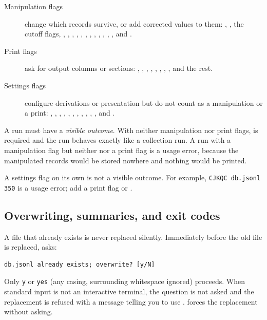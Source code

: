 \begin{description}
  \item[Manipulation flags] change which records survive, or add corrected
        values to them:
        , , the cutoff flags, ,
        , , , ,
        , , , ,
        , , , and
        .
  \item[Print flags] ask for output columns or sections: ,
        , , , ,
        , , , and the rest.
  \item[Settings flags] configure derivations or presentation but do not
        count as a manipulation or a print: , ,
        , , , ,
        , , , , ,
        and .
\end{description}

A run must have a \emph{visible outcome}. With neither manipulation nor print
flags,  is required and the run behaves exactly like a collection
run. A run with a manipulation flag but neither  nor a print flag
is a usage error, because the manipulated records would be stored nowhere and
nothing would be printed.

\begin{note}
A settings flag on its own is not a visible outcome. For example,
\texttt{CJKQC db.jsonl}  \texttt{350} is a usage error; add a print flag or
.
\end{note}

\subsection{Overwriting, summaries, and exit codes}

A file that already exists is never replaced silently. Immediately before the
old file is replaced, \CJKQC{} asks:

\begin{verbatim}
db.jsonl already exists; overwrite? [y/N]
\end{verbatim}

Only \texttt{y} or \texttt{yes} (any casing, surrounding whitespace ignored)
proceeds. When standard input is not an interactive terminal, the question is
not asked and the replacement is refused with a message telling you to use
.  forces the replacement without asking.

